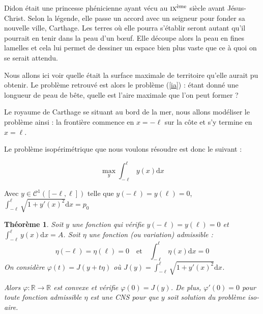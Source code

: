 \documentclass[10pt,a4paper]{article}
\newcommand{\R}{\mathbb{R}}
\newcommand{\C}{\mathcal{C}}
\renewcommand{\d}{\mathrm{d}}
\renewcommand{\phi}{\varphi}
\theoremstyle{plain}
\newtheorem{thm}{Théorème}[section]
\theoremstyle{definition}
\begin{document}
Didon était une princesse phénicienne ayant vécu au $\textsc{ix}^\text{ème}$ siècle avant Jésus-Christ. Selon la légende, elle passe un accord avec un seigneur pour fonder sa nouvelle ville, Carthage. Les terres où elle pourra s'établir seront \og autant qu'il pourrait en tenir dans la peau d'un b\oe{}uf\fg{}. Elle découpe alors la peau en fines lamelles et cela lui permet de dessiner un espace bien plus vaste que ce à quoi on se serait attendu.

Nous allons ici voir quelle était la surface maximale de territoire qu'elle aurait pu obtenir. Le problème retrouvé est alors le problème (\ref{ia}) : étant donné une longueur de peau de bête, quelle est l'aire maximale que l'on peut former ?


Le royaume de Carthage se situant au bord de la mer, nous allons modéliser le problème ainsi : la frontière commence en $x=-\ell$ sur la côte et s'y termine en $x=\ell$.

\begin{center}


\end{center}



Le problème isopérimétrique que nous voulons résoudre est donc le suivant :

\[\max_{y}\int_{-\ell}^\ell y(x)\d x\]

Avec $y\in\C^1([-\ell,\ell])$ telle que $y(-\ell)=y(\ell)=0$, $\int_{-\ell}^\ell\sqrt{1+y'(x)^2}\d x=p_0$





\begin{thm}
Soit $y$ une fonction qui vérifie $y(-\ell)=y(\ell)=0$ et $\displaystyle\int_{-\ell}^{\ell}y(x)\d x=A$. Soit $\eta$ une fonction (ou \emph{variation}) \emph{admissible} :
\[\eta(-\ell)=\eta(\ell)=0\quad \text{et}\quad\int_{-\ell}^{\ell}\eta(x)\d x=0\]
On considère $\phi(t)=J(y+t\eta)$ où $J(y)=\displaystyle\int_{-\ell}^{\ell}\sqrt{1+y'(x)^2}\d x$.

Alors $\phi\colon\R\to\R$ est convexe et vérifie $\phi(0)=J(y)$. De plus, $\phi'(0)=0$ pour toute fonction admissible $\eta$ est une CNS pour que $y$ soit solution du problème iso-aire.
\end{thm}
\end{document}
